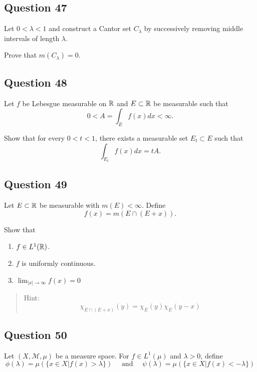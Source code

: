 \documentclass[12pt]{article}
\providecommand{\tightlist}{%
  \setlength{\itemsep}{0pt}\setlength{\parskip}{0pt}}
\begin{document}
\hypertarget{question-47-1}{%
\subsection{Question 47}\label{question-47-1}}

Let \(0 < \lambda < 1\) and construct a Cantor set \(C_\lambda\) by
successively removing middle intervals of length \(\lambda\).

Prove that \(m(C_\lambda) = 0\).

\hypertarget{question-48-1}{%
\subsection{Question 48}\label{question-48-1}}

Let \(f\) be Lebesgue measurable on \({\mathbb{R}}\) and \(E \subset {\mathbb{R}}\) be
measurable such that \[
0<A=\int_{E} f(x) d x<\infty.
\]

Show that for every \(0 < t < 1\), there exists a measurable set
\(E_t \subset E\) such that \[
\int_{E_{t}} f(x) d x=t A.
\]

\hypertarget{question-49-1}{%
\subsection{Question 49}\label{question-49-1}}

Let \(E \subset {\mathbb{R}}\) be measurable with \(m(E) < \infty\). Define \[
f(x)=m(E \cap(E+x)).
\]

Show that

\begin{enumerate}
\def\labelenumi{\arabic{enumi}.}
\tightlist
\item
  \(f\in L^1({\mathbb{R}})\).
\item
  \(f\) is uniformly continuous.
\item
  \(\lim _{|x| \rightarrow \infty} f(x)=0\)
\end{enumerate}

\begin{quote}
Hint: \[
\chi_{E \cap(E+x)}(y)=\chi_{E}(y) \chi_{E}(y-x)
\]
\end{quote}

\hypertarget{question-50-1}{%
\subsection{Question 50}\label{question-50-1}}

Let \((X, \mathcal M, \mu)\) be a measure space. For \(f\in L^1(\mu)\)
and \(\lambda > 0\), define \[
\phi(\lambda)=\mu(\{x \in X | f(x)>\lambda\}) 
\quad \text { and } \quad 
\psi(\lambda)=\mu(\{x \in X | f(x)<-\lambda\})
\]
\end{document}
